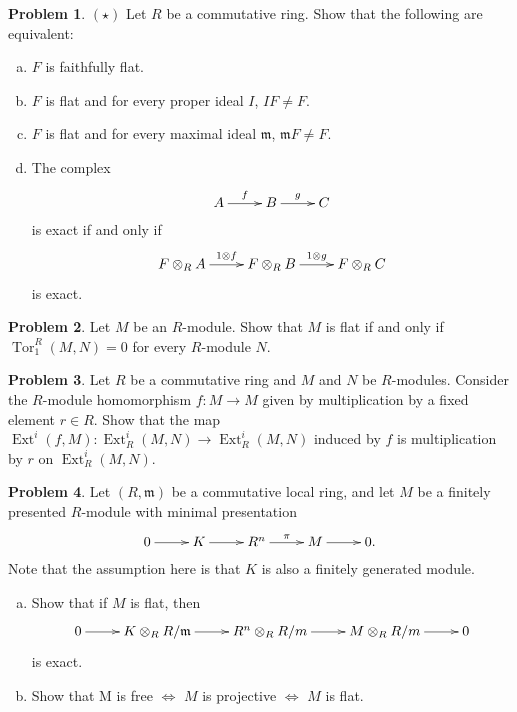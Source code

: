 \documentclass[11pt]{article}
\DeclareMathOperator{\Tor}{Tor}
\DeclareMathOperator{\Ext}{Ext}
\newcommand{\m}{\mathfrak{m}}
\theoremstyle{definition}
\newtheorem{problem}{Problem}
\begin{document}
\vspace{2em}

\noindent
{} 

\vspace{0.5em}

\begin{problem} 
$(\star)$ Let $R$ be a commutative ring.
Show that the following are equivalent:	
\begin{enumerate}[a)]
		\item $F$ is faithfully flat.
		\item $F$ is flat and for every proper ideal $I$, $IF \neq F$.
		\item $F$ is flat and for every maximal ideal $\m$, $\m F \neq F$.
		\item The complex
		$$\xymatrix{A \ar[r]^-f & B \ar[r]^-g & C}$$
		is exact if and only if 
		$$\xymatrix{F \otimes_R A \ar[r]^-{1 \otimes f} & F \otimes_R B \ar[r]^-{1 \otimes g} & F \otimes_R C}$$ 
		is exact.
	\end{enumerate}
\end{problem}


\vfill



\begin{problem}
Let $M$ be an $R$-module. Show that $M$ is flat if and only if $\Tor_1^R(M,N) = 0$ for every $R$-module $N$.
\end{problem}



\vfill
	
\begin{problem}
Let $R$ be a commutative ring and $M$ and $N$ be $R$-modules. Consider the $R$-module homomorphism $f\!: M \to M$ given by multiplication by a fixed element $r \in R$. Show that the map $\Ext^i(f,M)\!: \Ext^i_R(M,N) \to \Ext^i_R(M,N)$ induced by $f$ is multiplication by $r$ on $\Ext^i_R(M,N)$.
\end{problem}




\vfill


\newpage

\begin{problem}
Let $(R, \m)$ be a commutative local ring, and let $M$ be a finitely presented $R$-module with minimal presentation
$$\xymatrix{0 \ar[r] & K \ar[r] & R^n \ar[r]^-\pi & M \ar[r] & 0.}$$
Note that the assumption here is that $K$ is also a finitely generated module.
\begin{enumerate}[a)]
	\item Show that if $M$ is flat, then
$$\xymatrix{0 \ar[r] & K \otimes_R R/\m \ar[r] & R^n \otimes_R R/m \ar[r] & M \otimes_R R/m \ar[r] & 0}$$
is exact.
\item Show that 
	  M is free $\iff$ $M$ is projective $\iff$ $M$ is flat.
\end{enumerate}
\end{problem}
\end{document}
